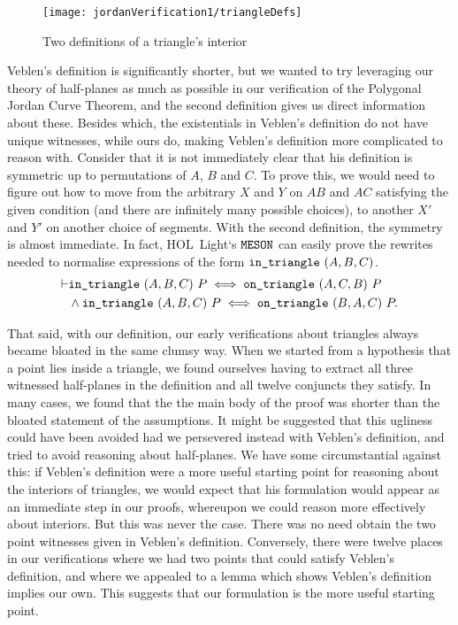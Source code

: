\begin{figure}
\centering\texttt{[image: jordanVerification1/triangleDefs]}
\caption{Two definitions of a triangle's interior}
\label{fig:triangleDefs}
\end{figure}

Veblen's definition is significantly shorter, but we wanted to try leveraging our theory of half-planes as much as possible in our verification of the Polygonal Jordan Curve Theorem, and the second definition gives us direct information about these. Besides which, the existentials in Veblen's definition do not have unique witnesses, while ours do, making Veblen's definition more complicated to reason with. Consider that it is not immediately clear that his definition is symmetric up to permutations of $A$, $B$ and $C$. To prove this, we would need to figure out how to move from the arbitrary $X$ and $Y$ on $AB$ and $AC$ satisfying the given condition (and there are infinitely many possible choices), to another $X'$ and $Y'$ on another choice of segments. With the second definition, the symmetry is almost immediate. In fact, HOL~Light`s $\texttt{MESON}$ can easily prove the rewrites needed to normalise expressions of the form $\texttt{in\_triangle}\ (A,B,C)$. 
\begin{equation}\label{eq:triSyms}
  \begin{split}
    \vdash&\code{in\_triangle}\ (A,B,C)\ P \iff \code{on\_triangle}\ (A,C,B)\ P\\
&    \wedge \code{in\_triangle}\ (A,B,C)\ P \iff \code{on\_triangle}\ (B,A,C)\ P.
  \end{split}
\end{equation}

That said, with our definition, our early verifications about triangles always became bloated in the same clumsy way. When we started from a hypothesis that a point lies inside a triangle, we found ourselves having to extract all three witnessed half-planes in the definition and all twelve conjuncts they satisfy. In many cases, we found that the the main body of the proof was shorter than the bloated statement of the assumptions. It might be suggested that this ugliness could have been avoided had we persevered instead with Veblen's definition, and tried to avoid reasoning about half-planes. We have some circumstantial against this: if Veblen's definition were a more useful starting point for reasoning about the interiors of triangles, we would expect that his formulation would appear as an immediate step in our proofs, whereupon we could reason more effectively about interiors. But this was never the case. There was no need obtain the two point witnesses given in Veblen's definition. Conversely, there were twelve places in our verifications where we had two points that could satisfy Veblen's definition, and where we appealed to a lemma which shows Veblen's definition implies our own. This suggests that our formulation is the more useful starting point.


